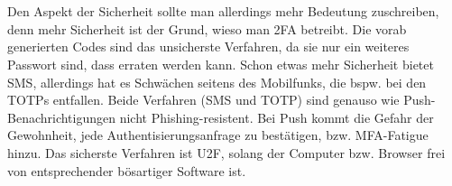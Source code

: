 \\\\
Den Aspekt der Sicherheit sollte man allerdings mehr Bedeutung zuschreiben, denn 
mehr Sicherheit ist der Grund, wieso man 2FA betreibt. Die vorab generierten Codes 
sind das unsicherste Verfahren, da sie nur ein weiteres Passwort sind, 
dass erraten werden kann. Schon etwas mehr Sicherheit bietet SMS, allerdings hat es 
Schwächen seitens des Mobilfunks, die bspw. bei den TOTPs entfallen. Beide Verfahren 
(SMS und TOTP) sind genauso wie Push-Benachrichtigungen nicht Phishing-resistent. 
Bei Push kommt die Gefahr der Gewohnheit, jede Authentisierungsanfrage zu 
bestätigen, bzw. MFA-Fatigue hinzu. Das sicherste Verfahren ist U2F, solang der 
Computer bzw. Browser frei von entsprechender bösartiger Software ist.
